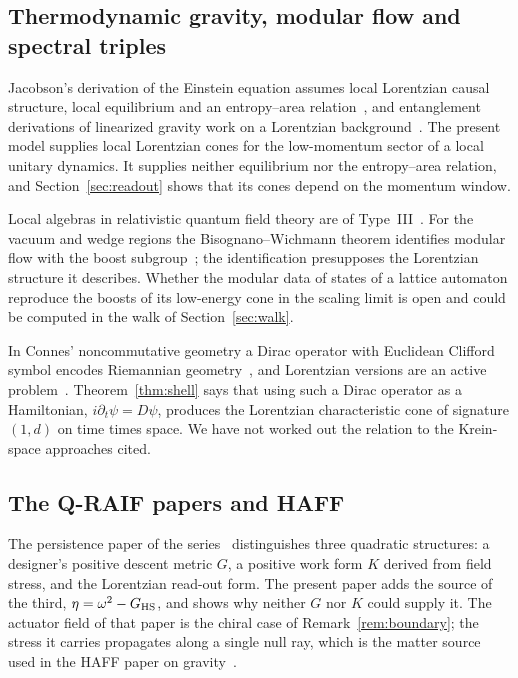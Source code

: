 \documentclass[12pt]{article}
\theoremstyle{definition}
\theoremstyle{remark}
\begin{document}
\subsection{Thermodynamic gravity, modular flow and spectral triples}

Jacobson's derivation of the Einstein equation assumes local Lorentzian causal structure, local equilibrium and an entropy--area relation~\cite{Jacobson1995}, and entanglement derivations of linearized gravity work on a Lorentzian background~\cite{Faulkner2014,Lashkari2014}. The present model supplies local Lorentzian cones for the low-momentum sector of a local unitary dynamics. It supplies neither equilibrium nor the entropy--area relation, and Section~\ref{sec:readout} shows that its cones depend on the momentum window.

Local algebras in relativistic quantum field theory are of Type~III~\cite{Haag1996,Witten2018}. For the vacuum and wedge regions the Bisognano--Wichmann theorem identifies modular flow with the boost subgroup~\cite{BisognanoWichmann1975,BisognanoWichmann1976}; the identification presupposes the Lorentzian structure it describes. Whether the modular data of states of a lattice automaton reproduce the boosts of its low-energy cone in the scaling limit is open and could be computed in the walk of Section~\ref{sec:walk}.

In Connes' noncommutative geometry a Dirac operator with Euclidean Clifford symbol encodes Riemannian geometry~\cite{Connes1994}, and Lorentzian versions are an active problem~\cite{Barrett2007,PaschkeSitarz2006,VandenDungen2016}. Theorem~\ref{thm:shell} says that using such a Dirac operator as a Hamiltonian, $i\partial_t\psi=D\psi$, produces the Lorentzian characteristic cone of signature $(1,d)$ on time times space. We have not worked out the relation to the Krein-space approaches cited.

\subsection{The Q-RAIF papers and HAFF}

The persistence paper of the series~\cite{Liu2026QRAIF_B} distinguishes three quadratic structures: a designer's positive descent metric $G$, a positive work form $K$ derived from field stress, and the Lorentzian read-out form. The present paper adds the source of the third, $\eta=\omega^2-G_{\rm HS}$, and shows why neither $G$ nor $K$ could supply it. The actuator field of that paper is the chiral case of Remark~\ref{rem:boundary}; the stress it carries propagates along a single null ray, which is the matter source used in the HAFF paper on gravity~\cite{Liu2026HAFFD}.
\end{document}
